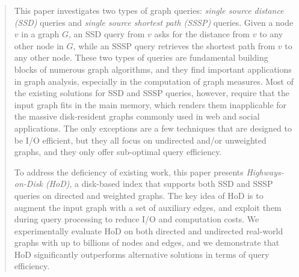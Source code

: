 \documentclass{sig-alternate}
\begin{document}
\begin{sloppy}
\begin{abstract}
This paper investigates two types of graph queries: {\em single source distance (SSD)} queries and {\em single source shortest path (SSSP)} queries. Given a node $v$ in a graph $G$, an SSD query from $v$ asks for the distance from $v$ to any other node in $G$, while an SSSP query retrieves the shortest path from $v$ to any other node. These two types of queries are fundamental building blocks of numerous graph algorithms, and they find important applications in graph analysis, especially in the computation of graph measures. Most of the existing solutions for SSD and SSSP queries, however, require that the input graph fits in the main memory, which renders them inapplicable for the massive disk-resident graphs commonly used in web and social applications. The only exceptions are a few techniques that are designed to be I/O efficient, but they all focus on undirected and/or unweighted graphs, and they only offer sub-optimal query efficiency.

To address the deficiency of existing work, this paper presents {\em Highways-on-Disk (HoD)}, a disk-based index that supports both SSD and SSSP queries on directed and weighted graphs. The key idea of HoD is to augment the input graph with a set of auxiliary edges, and exploit them during query processing to reduce I/O and computation costs. We experimentally evaluate HoD on both directed and undirected real-world graphs with up to billions of nodes and edges, and we demonstrate that HoD significantly outperforms alternative solutions in terms of query efficiency.



\end{abstract}
\end{sloppy}
\end{document}
